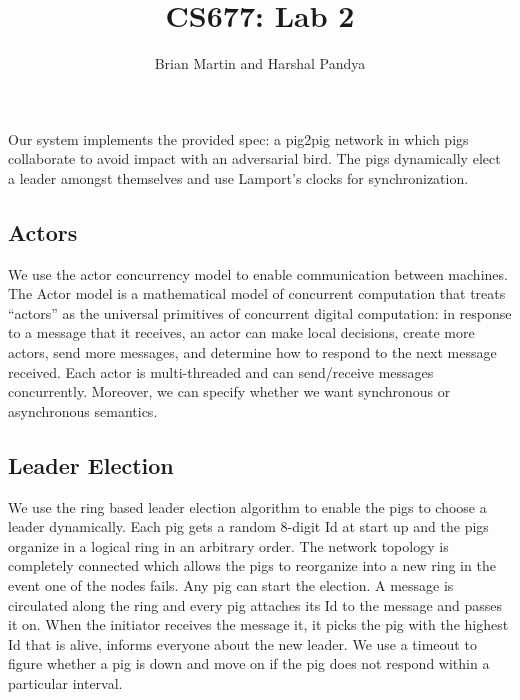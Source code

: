 \documentclass[]{article}
\title{CS677: Lab 2}
\author{Brian Martin and Harshal Pandya}
\date{}
\begin{document}
\maketitle

Our system implements the provided spec: a pig2pig network in which pigs
collaborate to avoid impact with an adversarial bird. The pigs dynamically 
elect a leader amongst themselves and use Lamport's clocks for synchronization.

\subsection{Actors}
We use the actor concurrency model to enable communication between machines. The
Actor model is a mathematical model of concurrent computation that
treats ``actors'' as the universal primitives of concurrent digital
computation: in response to a message that it receives, an actor can
make local decisions, create more actors, send more messages, and
determine how to respond to the next message received. Each actor is multi-threaded 
and can send/receive messages concurrently. Moreover, we can specify whether we want 
synchronous or asynchronous semantics.

\subsection{Leader Election}
We use the ring based leader election algorithm to enable the pigs to choose a leader dynamically.
Each pig gets a random 8-digit Id at start up and the pigs organize in a logical ring in an arbitrary order.
The network topology is completely connected which allows the pigs to reorganize into a new ring in the
event one of the nodes fails. Any pig can start the election. A message is circulated along the ring and every 
pig attaches its Id to the message and passes it on. When the initiator receives the message it, it picks the 
pig with the highest Id that is alive, informs everyone about the new leader. We use a timeout to figure whether 
a pig is down and move on if the pig does not respond within a particular interval.
\end{document}
